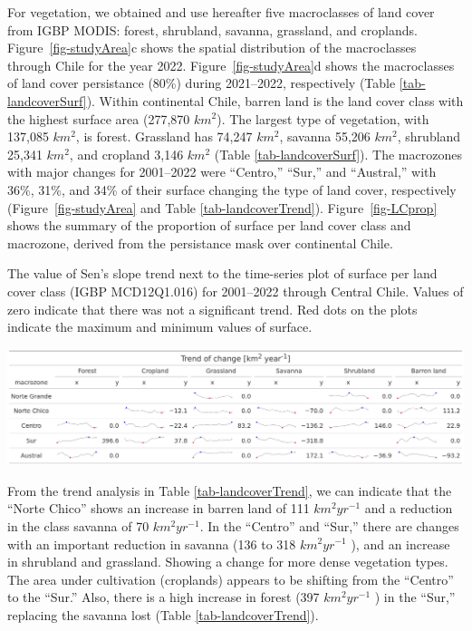 \documentclass[
  authoryear,
  preprint,
  3p,
  onecolumn]{elsarticle}
\begin{document}
For vegetation, we obtained and use hereafter five macroclasses of land
cover from IGBP MODIS: forest, shrubland, savanna, grassland, and
croplands. Figure~\ref{fig-studyArea}c shows the spatial distribution of
the macroclasses through Chile for the year 2022.
Figure~\ref{fig-studyArea}d shows the macroclasses of land cover
persistance (80\%) during 2021--2022, respectively (Table
\ref{tab-landcoverSurf}). Within continental Chile, barren land is the
land cover class with the highest surface area (277,870 \(km^2\)). The
largest type of vegetation, with 137,085 \(km^2\), is forest. Grassland
has 74,247 \(km^2\), savanna 55,206 \(km^2\), shrubland 25,341 \(km^2\),
and cropland 3,146 \(km^2\) (Table \ref{tab-landcoverSurf}). The
macrozones with major changes for 2001--2022 were ``Centro,'' ``Sur,''
and ``Austral,'' with 36\%, 31\%, and 34\% of their surface changing the
type of land cover, respectively (Figure~\ref{fig-studyArea} and Table
\ref{tab-landcoverTrend}). Figure~\ref{fig-LCprop} shows the summary of
the proportion of surface per land cover class and macrozone, derived
from the persistance mask over continental Chile.

\begin{table}[!ht]
\caption{The value of Sen's slope trend next to the time-series plot of surface per land cover class (IGBP MCD12Q1.016) for 2001–2022 through Central Chile. Values of zero indicate that there was not a significant trend. Red dots on the plots indicate the maximum and minimum values of surface.}
\label{tab-landcoverTrend}
\includegraphics[]{../output/figs/table_var_landcover_macro.png}
\end{table}

From the trend analysis in Table \ref{tab-landcoverTrend}, we can
indicate that the ``Norte Chico'' shows an increase in barren land of
111 \(km^2 yr^{-1}\) and a reduction in the class savanna of 70
\(km^2 yr^{-1}\). In the ``Centro'' and ``Sur,'' there are changes with
an important reduction in savanna (136 to 318 \(km^2 yr^{-1}\) ), and an
increase in shrubland and grassland. Showing a change for more dense
vegetation types. The area under cultivation (croplands) appears to be
shifting from the ``Centro'' to the ``Sur.'' Also, there is a high
increase in forest (397 \(km^2 yr^{-1}\) ) in the ``Sur,'' replacing the
savanna lost (Table \ref{tab-landcoverTrend}).
\end{document}
